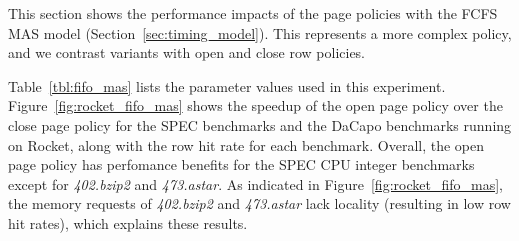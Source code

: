 This section shows the performance impacts of the page policies with the FCFS MAS model
(Section~\ref{sec:timing_model}). This represents a more complex policy, and we contrast variants with open and close row policies.

\begin{table}[t]
\centering
{}
\caption{FIFO MAS Parameters}
\label{tbl:fifo_mas}
\end{table}

Table~\ref{tbl:fifo_mas} lists the parameter values used in this experiment.
Figure~\ref{fig:rocket_fifo_mas} shows the speedup of the open page policy over the close page
policy for the SPEC benchmarks and the DaCapo benchmarks running on Rocket, along with the row
hit rate for each benchmark. Overall, the open page policy has perfomance benefits for the SPEC
CPU integer benchmarks except for \textit{402.bzip2} and \textit{473.astar}. As indicated in
Figure~\ref{fig:rocket_fifo_mas}, the memory requests of \textit{402.bzip2} and
\textit{473.astar} lack locality (resulting in low row hit rates), which explains these results.
